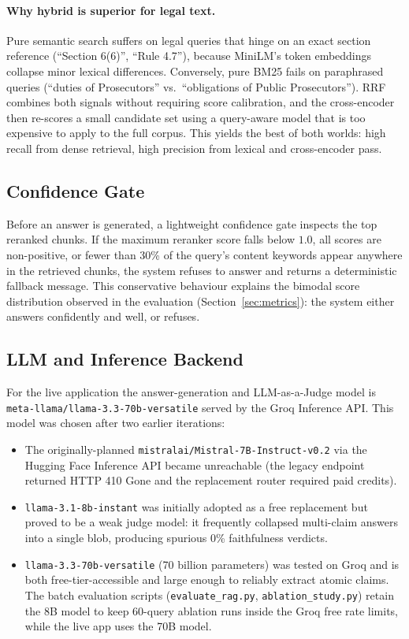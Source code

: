 \documentclass[11pt,a4paper]{article}
\begin{document}
\paragraph{Why hybrid is superior for legal text.}
Pure semantic search suffers on legal queries that hinge on an exact section reference (``Section 6(6)'', ``Rule 4.7''), because MiniLM's token embeddings collapse minor lexical differences. Conversely, pure BM25 fails on paraphrased queries (``duties of Prosecutors'' vs.\ ``obligations of Public Prosecutors''). RRF combines both signals without requiring score calibration, and the cross-encoder then re-scores a small candidate set using a query-aware model that is too expensive to apply to the full corpus. This yields the best of both worlds: high recall from dense retrieval, high precision from lexical and cross-encoder pass.

\subsection{Confidence Gate}

Before an answer is generated, a lightweight confidence gate inspects the top reranked chunks. If the maximum reranker score falls below $1.0$, all scores are non-positive, or fewer than 30\% of the query's content keywords appear anywhere in the retrieved chunks, the system refuses to answer and returns a deterministic fallback message. This conservative behaviour explains the bimodal score distribution observed in the evaluation (Section~\ref{sec:metrics}): the system either answers confidently and well, or refuses.

\subsection{LLM and Inference Backend}

For the live application the answer-generation and LLM-as-a-Judge model is \texttt{meta-llama/llama-3.3-70b-versatile} served by the Groq Inference API. This model was chosen after two earlier iterations:
\begin{itemize}[leftmargin=*]
    \item The originally-planned \texttt{mistralai/Mistral-7B-Instruct-v0.2} via the Hugging Face Inference API became unreachable (the legacy endpoint returned HTTP 410 Gone and the replacement router required paid credits).
    \item \texttt{llama-3.1-8b-instant} was initially adopted as a free replacement but proved to be a weak judge model: it frequently collapsed multi-claim answers into a single blob, producing spurious 0\% faithfulness verdicts.
    \item \texttt{llama-3.3-70b-versatile} (70 billion parameters) was tested on Groq and is both free-tier-accessible and large enough to reliably extract atomic claims. The batch evaluation scripts (\texttt{evaluate\_rag.py}, \texttt{ablation\_study.py}) retain the 8B model to keep 60-query ablation runs inside the Groq free rate limits, while the live app uses the 70B model.
\end{itemize}
\end{document}
